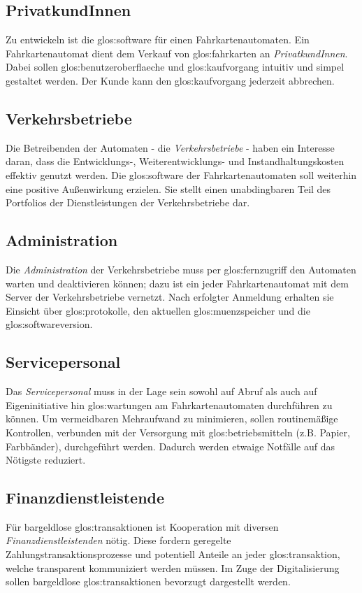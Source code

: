 \documentclass{lastenheft}
\begin{document}
\subsection*{PrivatkundInnen}
\label{sec:PrivatkundInnen}
Zu entwickeln ist die \gls{glos:software} für einen Fahrkartenautomaten.
Ein Fahrkartenautomat dient dem Verkauf von \gls{glos:fahrkarte}n an \emph{PrivatkundInnen}.
Dabei sollen \gls{glos:benutzeroberflaeche} und \gls{glos:kaufvorgang} intuitiv und simpel gestaltet werden.
Der Kunde kann den \gls{glos:kaufvorgang} jederzeit abbrechen.

\subsection*{Verkehrsbetriebe}
\label{sec:Verkehrsbetriebe}
Die Betreibenden der Automaten - die \emph{Verkehrsbetriebe} - haben ein Interesse daran, dass die Entwicklungs-, Weiterentwicklungs- und Instandhaltungskosten effektiv genutzt werden.
Die \gls{glos:software} der Fahrkartenautomaten soll weiterhin eine positive Außenwirkung erzielen.
Sie stellt einen unabdingbaren Teil des Portfolios der Dienstleistungen der Verkehrsbetriebe dar.

\subsection*{Administration}
\label{sec:Administration}
Die \emph{Administration} der Verkehrsbetriebe muss per \gls{glos:fernzugriff} den Automaten warten und deaktivieren können; dazu ist ein jeder Fahrkartenautomat mit dem Server der Verkehrsbetriebe vernetzt.
Nach erfolgter Anmeldung erhalten sie Einsicht über \gls{glos:protokoll}e, den aktuellen \gls{glos:muenzspeicher} und die \gls{glos:softwareversion}.

\subsection*{Servicepersonal}
\label{sec:Servicepersonal}
Das \emph{Servicepersonal} muss in der Lage sein sowohl auf Abruf als auch auf Eigeninitiative hin \gls{glos:wartung}en am Fahrkartenautomaten durchführen zu können.
Um vermeidbaren Mehraufwand zu minimieren, sollen routinemäßige Kontrollen, verbunden mit der Versorgung mit \gls{glos:betriebsmittel}n (z.B. Papier, Farbbänder), durchgeführt werden.
Dadurch werden etwaige Notfälle auf das Nötigste reduziert.

\subsection*{Finanzdienstleistende}
\label{sec:Finanzdienstleistende}
Für bargeldlose \gls{glos:transaktion}en ist Kooperation mit diversen \emph{Finanzdienstleistenden} nötig.
Diese fordern geregelte Zahlungstransaktionsprozesse und potentiell Anteile an jeder \gls{glos:transaktion}, welche transparent kommuniziert werden müssen.
Im Zuge der Digitalisierung sollen bargeldlose \gls{glos:transaktion}en bevorzugt dargestellt werden.
\end{document}
